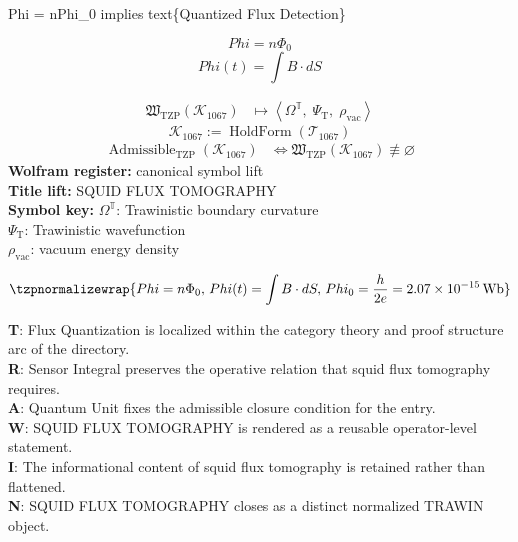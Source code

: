 
\begin{tzpsnapshot}
\end{tzpsnapshot}

Phi = nPhi\_0 implies text\{Quantized Flux Detection\}

\[
Phi=n\Phi_{0}
\]
\[
Phi(t)=\int B\cdot dS
\]

\noindent
\begin{minipage}[t]{0.48\linewidth}
\begingroup
\small
\[
\begin{aligned}
\mathfrak{W}_{\mathrm{TZP}}\!\left(\mathcal{K}_{1067}\right)
&\longmapsto
\left\langle \Omega^{\mathbb{T}},\; \Psi_{\mathrm{T}},\; \rho_{\mathrm{vac}} \right\rangle
\end{aligned}
\]
\[
\mathcal{K}_{1067}
:=
\operatorname{HoldForm}\!\left(\mathcal{T}_{1067}\right)
\]
\[
\begin{aligned}
\operatorname{Admissible}_{\mathrm{TZP}}\!\left(\mathcal{K}_{1067}\right)
&\Longleftrightarrow
\mathfrak{W}_{\mathrm{TZP}}\!\left(\mathcal{K}_{1067}\right)\not\equiv\varnothing
\end{aligned}
\]
\textbf{Wolfram register:} canonical symbol lift\\
\textbf{Title lift:} SQUID FLUX TOMOGRAPHY\\
\textbf{Symbol key:} \(\Omega^{\mathbb{T}}\): Trawinistic boundary curvature\\ \(\Psi_{\mathrm{T}}\): Trawinistic wavefunction\\ \(\rho_{\mathrm{vac}}\): vacuum energy density
\par
\endgroup
\end{minipage}\hfill
\begin{minipage}[t]{0.48\linewidth}
\[
\tzpnormalizewrap{Phi=n\Phi_{0},\,Phi(t)=\int B\cdot dS,\,Phi_{0}=\frac{h}{2e}=2.07\times 10^{-15}\,\mathrm{Wb}}
\]

\small
\textbf{T}: Flux Quantization is localized within the category theory and proof structure arc of the directory.\\
\textbf{R}: Sensor Integral preserves the operative relation that squid flux tomography requires.\\
\textbf{A}: Quantum Unit fixes the admissible closure condition for the entry.\\
\textbf{W}: SQUID FLUX TOMOGRAPHY is rendered as a reusable operator-level statement.\\
\textbf{I}: The informational content of squid flux tomography is retained rather than flattened.\\
\textbf{N}: SQUID FLUX TOMOGRAPHY closes as a distinct normalized TRAWIN object.
\normalsize
\end{minipage}

